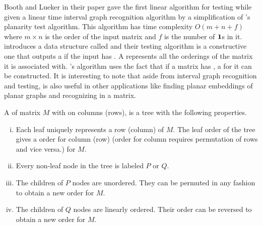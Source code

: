 Booth and Lueker in their paper \cite{bl76} gave the first linear
algorithm for \cop testing while given a linear time interval graph
recognition algorithm by a simplification of \cite{lec67}'s planarity
test algorithm. This \COT algorithm has time complexity
$O\left(m+n+f\right)$ where $m \times n$ is the order of the input
matrix and $f$ is the number of $\textbf{1}$s in it.
%
\cite{bl76} introduces a data structure called \PQtree and their \COP
testing algorithm is a constructive one that outputs a \PQtree if the
input has \COP. A \PQtree represents all the \COP orderings of the
matrix it is associated with. \cite{bl76}'s algorithm uses the fact
that if a matrix has \COP, a \PQtree for it can be constructed. It is
interesting to note that aside from interval graph recognition and
\COP testing, \PQtree is also useful in other applications like
finding planar embeddings of planar graphs \cite{lec67,mcc04} and
recognizing \CROP in a matrix.

\begin{definition}
  A \PQtree of matrix $M$ with \COP on columns (rows), is a tree with
  the following properties.
  \begin{enumerate}[i.]
    \singlespacing
  \item Each leaf uniquely represents a row (column) of $M$. The leaf
    order of the tree gives a \COP order for column (row) (\COP order
    for column requires permutation of rows and vice versa.) for $M$.
  \item Every non-leaf node in the tree is labeled $P$ or $Q$.
  \item \label{def::nodep} The children of $P$ nodes are
    unordered. They can be permuted in any fashion to obtain a new
    \COP order for $M$.
  \item \label{def::nodeq} The children of $Q$ nodes are linearly
    ordered. Their order can be reversed to obtain a new \COP
    order for $M$.
  \end{enumerate}
  \label{def:pqtree}
\end{definition}

